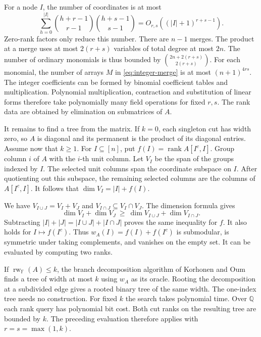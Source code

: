 \documentclass[11pt,reqno]{amsart}
\theoremstyle{remark}
\numberwithin{equation}{section}
\newcommand{\rk}{\operatorname{rank}}
\newcommand{\F}{\mathbb F}
\begin{document}
For a node \(I\), the number of coordinates is at most
\[
 \sum_{h=0}^{|I|}\binom{h+r-1}{r-1}\binom{h+s-1}{s-1}
       =O_{r,s}((|I|+1)^{r+s-1}).
\]
Zero-rank factors only reduce this number. There are \(n-1\)
merges. The product at a merge uses at most \(2(r+s)\)
variables of total degree at most \(2n\). The number of ordinary
monomials is thus bounded by \(\binom{2n+2(r+s)}{2(r+s)}\). For each
monomial, the number of arrays \(M\) in \eqref{eq:integer-merge} is
at most \((n+1)^{4rs}\). The integer coefficients can be formed by
binomial coefficient tables and multiplication. Polynomial multiplication,
contraction and substitution of linear forms therefore take polynomially
many field operations for fixed \(r,s\). The rank data are obtained
by elimination on submatrices of \(A\).

It remains to find a tree from the matrix.
If \(k=0\), each singleton cut has width zero, so \(A\) is diagonal
and its permanent is the product of its diagonal entries. Assume now that \(k\geq1\).
For \(I\subseteq[n]\), put
\(f(I)=\rk A[I^c,I]\). Group column \(i\) of \(A\) with the \(i\)-th
unit column. Let \(V_I\) be the span of the groups indexed by \(I\).
The selected unit columns span the coordinate subspace on \(I\).
After quotienting out this subspace, the remaining selected columns
are the columns of \(A[I^c,I]\). It follows that
\(\dim V_I=|I|+f(I)\).

We have \(V_{I\cup J}=V_I+V_J\) and \(V_{I\cap J}\subseteq V_I\cap V_J\).
The dimension formula gives
\[
 \dim V_I+\dim V_J\ \geq\ \dim V_{I\cup J}+\dim V_{I\cap J}.
\]
Subtracting \(|I|+|J|=|I\cup J|+|I\cap J|\) proves the same inequality
for \(f\). It also holds for \(I\mapsto f(I^c)\). Thus
\(w_A(I)=f(I)+f(I^c)\) is submodular, is symmetric under taking
complements, and vanishes on the empty set. It can be evaluated
by computing two ranks.

If \(\operatorname{rw}_{\F}(A)\le k\), the branch decomposition
algorithm of Korhonen and Oum \cite{KorhonenOum} finds a tree of
width at most \(k\) using \(w_A\) as its oracle. Rooting the
decomposition at a subdivided edge gives a rooted binary tree
of the same width. The one-index tree needs no construction.
For fixed \(k\) the search takes polynomial time. Over \(\mathbb Q\)
each rank query has polynomial bit cost. Both cut ranks on the
resulting tree are bounded by \(k\).
The preceding evaluation therefore applies with
\(r=s=\max(1,k)\).
\end{document}
